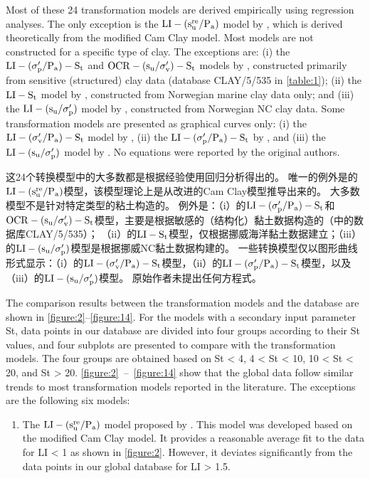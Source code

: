 \begin{paracol}{2}
{    \switchcolumn*
        
    Most of these 24 transformation models are derived empirically using regression analyses. The only exception is the $\rm{LI}-(s_u^{re}/P_a)$ model by \citet{Wroth1978137}, which is derived  theoretically from the modified Cam Clay model. Most models are not constructed for a specific type of clay. The exceptions are: (i) the $\rm{LI}-(\sigma_p'/P_a)-S_t$ and $\rm{OCR}-(s_u/\sigma_v')-S_t$ models by \citet{Ching2012522}, constructed primarily from sensitive (structured) clay data (database CLAY/5/535 in \autoref{table:1}); (ii) the $\rm{LI}-S_t$ model by \citet{Bjerrum195449}, constructed from Norwegian marine clay data only; and (iii) the $\rm{LI}-(s_u/\sigma_p')$ model by \citet{Bjerrum1960711}, constructed from Norwegian NC clay data. Some transformation models are presented as graphical curves only: (i) the $\rm{LI}-(\sigma_v'/P_a)-S_t$ model by \citet{Mitchell1993}, (ii) the $\rm{LI}-(\sigma_p'/P_a)-S_t$ by \citet{NAVFAC1982}, and (iii) the $\rm{LI}-(s_u/\sigma_p')$ model by \citet{Bjerrum1960711}. No equations were reported by the original authors.
    
    \switchcolumn
        
    这24个转换模型中的大多数都是根据经验使用回归分析得出的。 唯一的例外是\citet{Wroth1978137}的$\rm{LI}-(s_u^{re}/P_a)$模型，该模型理论上是从改进的Cam Clay模型推导出来的。 大多数模型不是针对特定类型的粘土构造的。 例外是：（i）\citet{Ching2012522}的$\rm{LI}-(\sigma_p'/P_a)-S_t$和$\rm{OCR}-(s_u/\sigma_v')-S_t$模型，主要是根据敏感的（结构化）黏土数据构造的（中的数据库CLAY/5/535）； （ii）\citet{Bjerrum195449}的$\rm{LI}-S_t$模型，仅根据挪威海洋黏土数据建立；（iii）\citet{Bjerrum1960711}的$\rm{LI}-(s_u/\sigma_p')$模型是根据挪威NC黏土数据构建的。 一些转换模型仅以图形曲线形式显示：（i）\citet{Mitchell1993}的$\rm{LI}-(\sigma_v'/P_a)-S_t$模型，（ii）\citet{NAVFAC1982}的$\rm{LI}-(\sigma_p'/P_a)-S_t$模型，以及（iii）\citet{Bjerrum1960711}的$\rm{LI}-(s_u/\sigma_p')$模型。 原始作者未提出任何方程式。
    
    
    \switchcolumn*
        
    The comparison results between the transformation models and the database are shown in \autoref{figure:2}–\autoref{figure:14}. For the models with a secondary input parameter St, data points in our database are divided into four groups according to their St values, and four subplots are presented to compare with the transformation models. The four groups are obtained based on St < 4, 4 < St < 10, 10 < St < 20, and St > 20. \autoref{figure:2}~–~\autoref{figure:14} show that the global data follow similar trends to most transformation models reported in the literature. The exceptions are the following six models:
    \begin{enumerate}
        \item The $\rm{LI}-(s_u^{re}/P_a)$ model proposed by \citet{Wroth1978137}. This model was developed based on the modified Cam Clay model. It provides a reasonable average fit to the data for LI < 1 as shown in \autoref{figure:2}. However, it deviates significantly from the data points in our global database for LI > 1.5.
        

\end{enumerate}}
\end{paracol}
